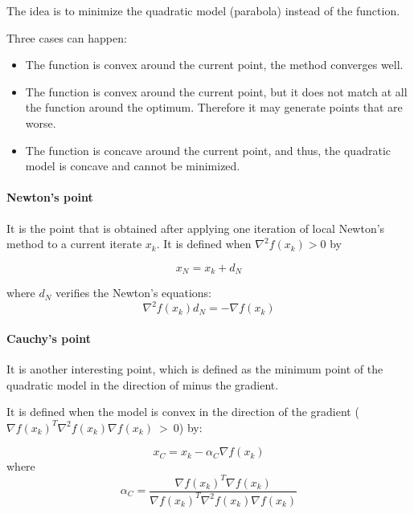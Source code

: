 The idea is to minimize the quadratic model (parabola) instead of the function.

Three cases can happen:
\begin{itemize}
    \item The function is convex around the current point, the method converges well.
    \item The function is convex around the current point, but it does not match at all the function around the optimum. Therefore it may generate points that are worse.
    \item The function is concave around the current point, and thus, the quadratic model is concave and cannot be minimized.
\end{itemize}

\paragraph{Newton's point} It is the point that is obtained after applying one iteration of local Newton's method to a current iterate $x_k$.
It is defined when $\nabla^2 f(x_k) > 0$ by

\begin{equation}
    x_N = x_k + d_N
\end{equation}

where $d_N$ verifies the Newton's equations:
\begin{equation}
    \nabla^2 f(x_k) d_N = -\nabla f(x_k)
\end{equation}

\paragraph{Cauchy's point} It is another interesting point, which is defined as the minimum point of the quadratic model in the direction of minus the gradient. 

It is defined when the model is convex in the direction of the gradient ($\nabla f(x_k)^T \nabla^2 f(x_k) \nabla f(x_k)~>~0$) by:

\begin{equation}
    x_C = x_k - \alpha_C \nabla f(x_k)
\end{equation}
where 
\begin{equation}
    \alpha_C = \frac{\nabla f(x_k)^T\nabla f(x_k)}{\nabla f(x_k)^T\nabla^2 f(x_k) \nabla f(x_k)}
\end{equation}


